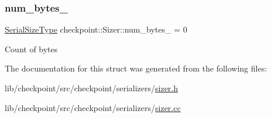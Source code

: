 \subsubsection{\texorpdfstring{num\+\_\+bytes\+\_\+}{num\_bytes\_}}
{\footnotesize\ttfamily \hyperlink{namespacecheckpoint_a083f6674da3f94c2901b18c6d238217c}{Serial\+Size\+Type} checkpoint\+::\+Sizer\+::num\+\_\+bytes\+\_\+ = 0\hspace{0.3cm}{\ttfamily [private]}}

Count of bytes 

The documentation for this struct was generated from the following files\+:\begin{DoxyCompactItemize}
\item 
lib/checkpoint/src/checkpoint/serializers/\hyperlink{lib_2checkpoint_2src_2checkpoint_2serializers_2sizer_8h}{sizer.\+h}\item 
lib/checkpoint/src/checkpoint/serializers/\hyperlink{sizer_8cc}{sizer.\+cc}\end{DoxyCompactItemize}
